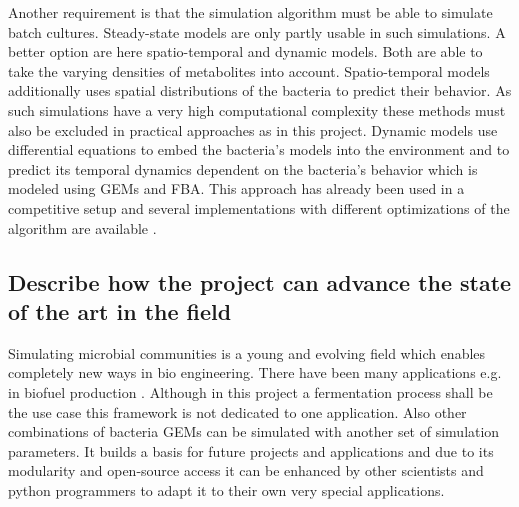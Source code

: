 Another requirement is that the simulation algorithm must be able to simulate batch cultures. Steady-state models are only partly usable in
such simulations. A better option are here spatio-temporal and dynamic models. Both are able to take the varying densities of metabolites
into account. Spatio-temporal models additionally uses spatial distributions of the bacteria to predict their behavior. As such simulations
have a very high computational complexity\cite{ZOMORRODI2016837} these methods must also be excluded in practical approaches as in this project.
Dynamic models use differential equations to embed the bacteria's models into the environment and to predict its temporal dynamics
dependent on the bacteria's behavior which is modeled using GEMs and FBA. This approach has already been used in a competitive setup \cite{zhuang2011genome}
and several implementations with different optimizations of the algorithm are available \cite{6915830}.





\subsection*{Describe how the project can advance the state of the art in the field}

Simulating microbial communities is a young and evolving field which enables completely new ways in bio engineering. There have been many 
applications e.g. in biofuel production \cite{hanly2011dynamic} \cite{chiu2014emergent}. Although in this project a fermentation process
shall be the use case this framework is not dedicated to one application. Also other combinations of bacteria GEMs can be simulated with
another set of simulation parameters. It builds a basis for future projects and applications and due to its modularity and open-source access
it can be enhanced by other scientists and python programmers to adapt it to their own very special applications.

